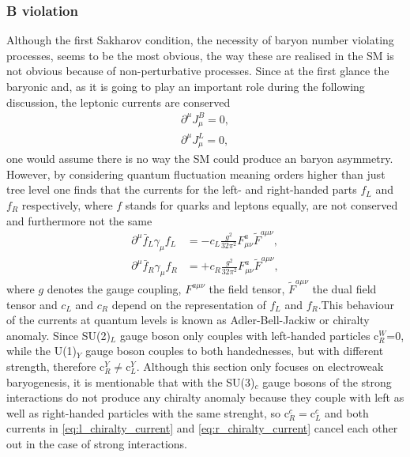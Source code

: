 \subsubsection{B violation}
Although the first Sakharov condition, the necessity of baryon number violating processes, seems to be the most obvious, the way these are realised in the SM is not obvious because of non-perturbative processes. \newline\indent
Since at the first glance the baryonic and, as it is going to play an important role during the following discussion, the leptonic currents are  conserved
\begin{align}
	\partial^\mu J_\mu^B=0,
	\label{eq:Bcurrent}
	\\
	\partial^\mu J_\mu^L=0,
	\label{eq:Lcurrent}
\end{align}
one would assume there is no way the SM could produce an baryon asymmetry. However, by considering quantum fluctuation meaning orders higher than just tree level one finds that the currents for the left- and right-handed parts $f_L$ and $f_R$ respectively, where $f$ stands for quarks and leptons equally, are not conserved and furthermore not the same \cite{Bernreuther:2002uj}
\begin{align}
	\partial^\mu\bar{f}_L\gamma_\mu f_L&=-c_L\frac{g^2}{32\pi^2}F^a_{\mu\nu}\tilde{F}^{a\mu\nu},
	\label{eq:l_chiralty_current}
	\\
	\partial^\mu\bar{f}_R\gamma_\mu f_R&=+c_R\frac{g^2}{32\pi^2}F^a_{\mu\nu}\tilde{F}^{a\mu\nu},
	\label{eq:r_chiralty_current}
\end{align}
where $g$ denotes the gauge coupling, $F^{a\mu\nu}$ the field tensor, $\tilde{F}^{a\mu\nu}$ the dual field tensor and $c_L$ and $c_R$ depend on the representation of $f_L$ and $f_R$.This behaviour of the currents at quantum levels is known as Adler-Bell-Jackiw or chiralty anomaly. 
Since SU(2)$_L$ gauge boson only couples with left-handed particles c$_R^W$=0, while the U(1)$_Y$ gauge boson couples to both handednesses, but with different strength, therefore c$_R^Y\neq$c$_L^Y$. Although this section only focuses on electroweak baryogenesis, it is mentionable that with the SU(3)$_c$ gauge bosons of the strong interactions do not produce any chiralty anomaly because they couple with left as well as right-handed particles with the same strenght, so c$_R^c=$c$_L^c$ and both currents in \eqref{eq:l_chiralty_current} and \eqref{eq:r_chiralty_current} cancel each other out in the case of strong interactions. \newline\indent
